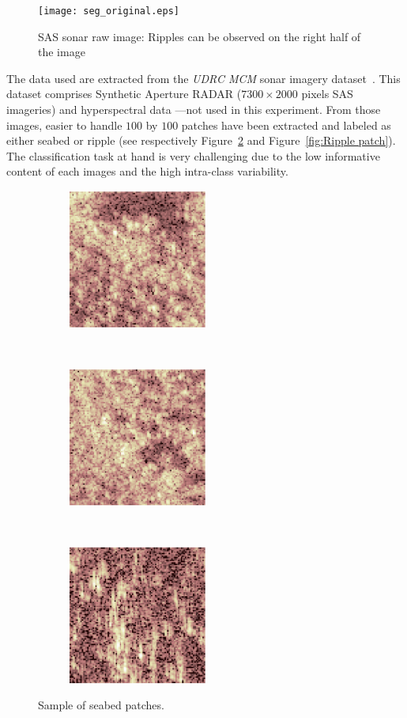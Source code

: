 \documentclass[a4paper,11pt]{report}
\begin{document}
		\begin{figure}[h]
			\centering
			\texttt{[image: seg\_original.eps]}
			\caption[SAS sonar raw image.]{SAS sonar raw image: Ripples can be observed on the right half of the image}
			\label{fir:SAS raw}
		\end{figure}		
		
		The data used are extracted from the \textit{UDRC MCM} sonar imagery dataset~\citep{udrc2015sonar}. This dataset comprises Synthetic Aperture RADAR ($7300 \times 2000$ pixels SAS imageries) and hyperspectral data ---not used in this experiment. From those images, easier to handle $100$ by $100$ patches have been extracted and labeled as either seabed or ripple (see respectively Figure~\ref{fig:Seabed patch} and Figure~\ref{fig:Ripple patch}). The classification task at hand is very challenging due to the low informative content of each images and the high intra-class variability.\\

		\begin{figure}[h]
			\centering
			\begin{subfigure}[t]{0.3\textwidth}
				\centering
				\includegraphics[height=1.8in]{patch_seabed_1.eps}
			\end{subfigure}%
			~ 
			\begin{subfigure}[t]{0.3\textwidth}
        \centering
        \includegraphics[height=1.8in]{patch_seabed_2.eps}
			\end{subfigure}
			~
			\begin{subfigure}[t]{0.3\textwidth}
        \centering
        \includegraphics[height=1.8in]{patch_seabed_3.eps}
			\end{subfigure}
			\caption{Sample of seabed patches.}
			\label{fig:Seabed patch}
		\end{figure}
		
\end{document}

